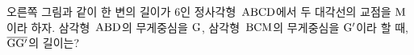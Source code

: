 \noindent\begin{minipage}[t]{0.58\linewidth}\vspace{0pt}\raggedright 오른쪽 그림과 같이 한 변의 길이가 $6$인 정사각형~$\mathrm{ABCD}$에서 두 대각선의 교점을 $\mathrm{M}$이라 하자. 삼각형~$\mathrm{ABD}$의 무게중심을 $\mathrm{G}$, 삼각형~$\mathrm{BCM}$의 무게중심을 $\mathrm{G}'$이라 할 때, $\overline{\mathrm{GG'}}$의 길이는?\end{minipage}\hfill\begin{minipage}[t]{0.4\linewidth}\vspace{0pt}\centering \resizebox{\ifdim\width>\linewidth\linewidth\else\width\fi}{!}{}\end{minipage}\par
{}

